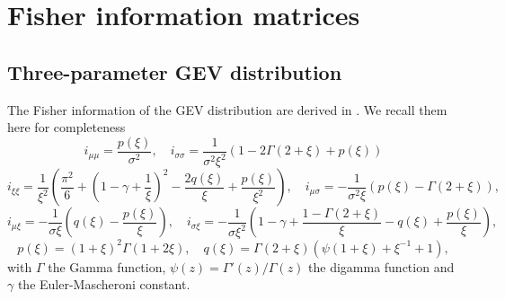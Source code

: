 \documentclass{article}
\newcommand{\1}{\mathds{1}}
\theoremstyle{definition}
\begin{document}





\clearpage
\appendix
\section{Fisher information matrices}

\subsection{Three-parameter GEV distribution}\label{sec:GEV_Fisher}

The Fisher information of the GEV distribution are derived in \cite{prescott1980maximum}. We recall them here for completeness
\begin{equation*}
i_{\mu \mu}=\frac{p(\xi)}{\sigma^2}, \quad i_{\sigma \sigma}=\frac{1}{\sigma^2 \xi^2}(1-2 \Gamma(2+\xi)+p(\xi))
\end{equation*}
\begin{equation*}
i_{\xi \xi}=\frac{1}{\xi^2}\left(\frac{\pi^2}{6}+\left(1-\gamma+\frac{1}{\xi}\right)^2-\frac{2 q(\xi)}{\xi}+\frac{p(\xi)}{\xi^2}\right), \quad i_{\mu \sigma}=-\frac{1}{\sigma^2 \xi}(p(\xi)-\Gamma(2+\xi)),
\end{equation*}
\begin{equation*}
i_{\mu \xi}=-\frac{1}{\sigma \xi}\left(q(\xi)-\frac{p(\xi)}{\xi}\right), \quad i_{\sigma \xi}=-\frac{1}{\sigma \xi^2}\left(1-\gamma+\frac{1-\Gamma(2+\xi)}{\xi}-q(\xi)+\frac{p(\xi)}{\xi}\right),
\end{equation*}
\begin{equation*}
p(\xi)=(1+\xi)^2 \Gamma(1+2 \xi), \quad q(\xi)=\Gamma(2+\xi)\left(\psi(1+\xi)+\xi^{-1}+1\right),
\end{equation*}
with $\Gamma$ the Gamma function, $\psi(z) = \Gamma'(z)/\Gamma(z)$ the digamma function and $\gamma$ the Euler-Mascheroni constant.
\end{document}
